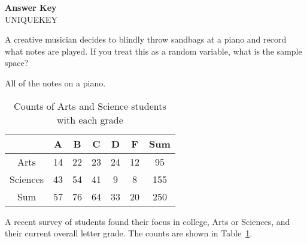 \documentclass[11pt]{exam}
\begin{document}
 {\ifprintanswers \textbf{Answer Key} \fi
  \\ UNIQUEKEY}
\headrule 
\cfoot{\thepage}

\begin{questions}



    \question[2] A creative musician decides to blindly throw sandbags at a
    piano and record what notes are played.  If you treat this as a random
    variable, what is the sample space?
    \begin{solutionordottedlines}[0.3in]
      All of the notes on a piano.
    \end{solutionordottedlines}





\begin{table}[ht]
\begin{center}
\begin{tabular}{|c|ccccc||c|}
  \hline
 & A & B & C & D & F & Sum \\ 
  \hline
Arts & 14 & 22 & 23 & 24 & 12 & 95 \\ 
  Sciences & 43 & 54 & 41 & 9 & 8 & 155 \\ 
   \hline
\hline
Sum & 57 & 76 & 64 & 33 & 20 & 250 \\ 
   \hline
\end{tabular}
\caption{Counts of Arts and Science students with each grade}
\label{tab:focus}
\end{center}
\end{table}

    \question A recent survey of students found their focus in college,
    Arts or Sciences, and their current overall letter grade.  The counts
    are shown in Table~\ref{tab:focus}.
\end{questions}
\end{document}

